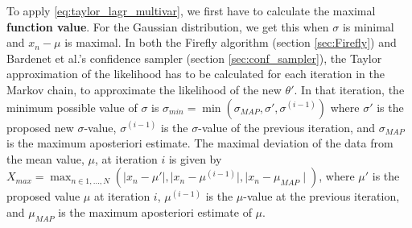 To apply \eqref{eq:taylor_lagr_multivar}, we first have to calculate the maximal \textbf{function value}.
For the Gaussian distribution, we get this when $\sigma$ is minimal and $x_n - \mu$ is maximal.
In both the Firefly algorithm (section \ref{sec:Firefly}) and Bardenet et al.'s confidence sampler (section \ref{sec:conf_sampler}), the Taylor approximation of the likelihood has to be calculated for each iteration in the Markov chain, to approximate the likelihood of the new $\theta'$. 
In that iteration, the minimum possible value of $\sigma$ is $\sigma_{min} = \min\left(\sigma_{MAP}, \sigma', \sigma^{(i-1)}\right) $ where $\sigma'$ is the proposed new $\sigma$-value, $\sigma^{(i-1)}$ is the $\sigma$-value of the previous iteration, and $\sigma_{MAP}$ is the maximum aposteriori estimate. 
The maximal deviation of the data from the mean value, $\mu$, at iteration $i$ is given by $X_{max} = \max_{n\in 1,\ldots, N} \left(\mid x_n - \mu'\mid, \mid x_n - \mu^{(i-1)}\mid, \mid x_n - \mu_{MAP}\mid\right)$, where $\mu'$ is the proposed value $\mu$ at iteration $i$, $\mu^{(i-1)}$ is the $\mu$-value at the previous iteration, and $\mu_{MAP}$ is the maximum aposteriori estimate of $\mu$. 
